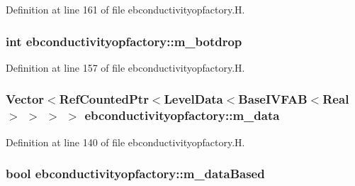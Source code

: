 Definition at line 161 of file ebconductivityopfactory.\+H.

\subsubsection[{\texorpdfstring{m\+\_\+botdrop}{m_botdrop}}]{\setlength{\rightskip}{0pt plus 5cm}int ebconductivityopfactory\+::m\+\_\+botdrop\hspace{0.3cm}{\ttfamily [protected]}}\hypertarget{classebconductivityopfactory_a1e14eecee77214710d8ec698e02189be}{}\label{classebconductivityopfactory_a1e14eecee77214710d8ec698e02189be}


Definition at line 157 of file ebconductivityopfactory.\+H.

\subsubsection[{\texorpdfstring{m\+\_\+data}{m_data}}]{\setlength{\rightskip}{0pt plus 5cm}Vector$<$Ref\+Counted\+Ptr$<$Level\+Data$<$Base\+I\+V\+F\+AB$<$Real$>$ $>$ $>$ $>$ ebconductivityopfactory\+::m\+\_\+data\hspace{0.3cm}{\ttfamily [protected]}}\hypertarget{classebconductivityopfactory_a0df40ee7927f95bc042ecf2b52308322}{}\label{classebconductivityopfactory_a0df40ee7927f95bc042ecf2b52308322}


Definition at line 140 of file ebconductivityopfactory.\+H.

\subsubsection[{\texorpdfstring{m\+\_\+data\+Based}{m_dataBased}}]{\setlength{\rightskip}{0pt plus 5cm}bool ebconductivityopfactory\+::m\+\_\+data\+Based\hspace{0.3cm}{\ttfamily [protected]}}\hypertarget{classebconductivityopfactory_a68181d10f867f265218ab116beecae62}{}\label{classebconductivityopfactory_a68181d10f867f265218ab116beecae62}


